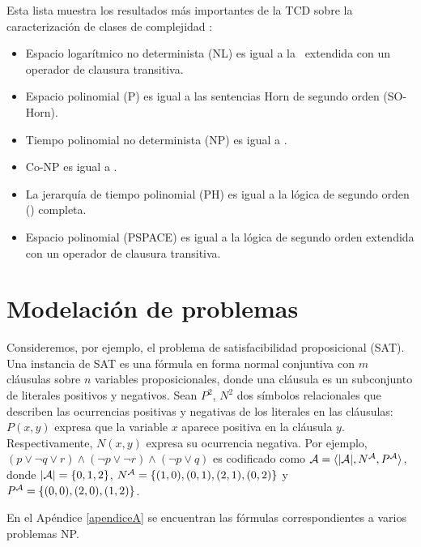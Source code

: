 Esta lista muestra los resultados más importantes de la TCD sobre la
caracterización de clases de complejidad \citep{immerman:book}:
\begin{itemize}
\item Espacio logarítmico no determinista (NL) es igual a la \LPO\ extendida con
un operador de clausura transitiva.
\item Espacio polinomial (P) es igual a las sentencias Horn de segundo orden
(SO-Horn).
\item Tiempo polinomial no determinista (NP) es igual a \SOE.
\item Co-NP es igual a \SOA.
\item La jerarquía de tiempo polinomial (PH) es igual a la lógica 
de segundo orden (\LSO) completa.
\item Espacio polinomial (PSPACE) es igual a la lógica de segundo orden
extendida con un operador de clausura transitiva.
\end{itemize}


\section{Modelación de problemas}
Consideremos, por ejemplo, el problema de satisfacibilidad
proposicional (SAT). Una instancia de SAT es una fórmula en forma normal
conjuntiva con $m$ cláusulas sobre $n$ variables proposicionales, donde una
cláusula es un subconjunto de literales positivos y negativos. 
Sean $P^2$, $N^2$ dos símbolos relacionales que describen las ocurrencias
positivas y negativas de los literales en las cláusulas: $P(x, y)$ expresa que
la variable $x$ aparece positiva en la cláusula $y$. Respectivamente, $N(x, y)$ expresa
su ocurrencia negativa.
Por ejemplo, $(p\lor \neg q\lor r)\land(\neg p\lor \neg r)\land(\neg p\lor q)$
es codificado como $\mathcal{A}=\langle |\mathcal{A}|,N^{\mathcal{A}},P^{\mathcal{A}} \rangle$, donde $|\mathcal{A}|=\{0,1,2\}$,
$N^{\mathcal{A}}=\{(1,0),(0,1),(2,1),(0,2)\}$ y $P^{\mathcal{A}}=\{(0,0),(2,0),(1,2)\}$.

En el Apéndice \ref{apendiceA} se encuentran las fórmulas correspondientes a
varios problemas NP.

